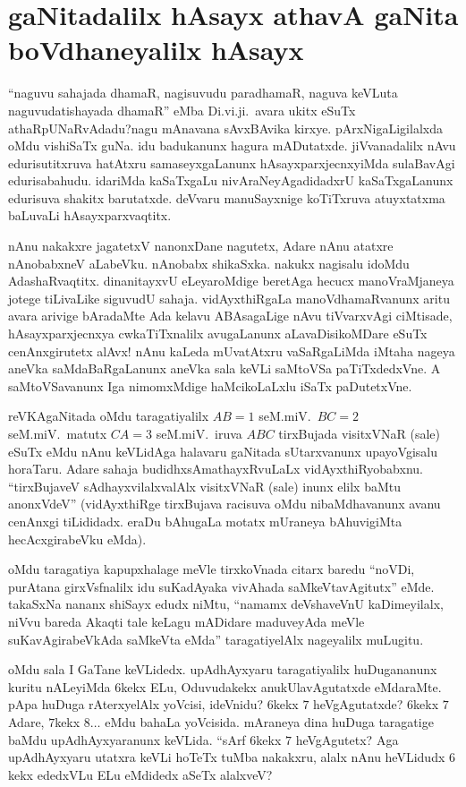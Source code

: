 \chapter{gaNitadalilx hAsayx athavA gaNita boVdhaneyalilx hAsayx}\label{chap14}

\qquad ``naguvu sahajada dhamaR, nagisuvudu paradhamaR, naguva keVLuta naguvudatishayada dhamaR'' eMba Di.vi.ji.\ avara ukitx eSuTx athaRpUNaRvAdadu?\break nagu mAnavana sAvxBAvika kirxye. pArxNigaLigilalxda oMdu vishiSaTx guNa. idu badukanunx\- hagura mADutatxde. jiVvanadalilx nAvu edurisutitxruva hatAtxru samaseyxgaLanunx hAsayxparxjecnxyiMda sulaBavAgi edurisabahudu. idariMda kaSaTxgaLu nivAraNeyAga\break didadxrU kaSaTxgaLanunx edurisuva shakitx barutatxde. deVvaru manuSayxnige koTiTxruva atuyxtatxma baLuvaLi hAsayxparxvaqtitx.

nAnu nakakxre jagatetxV nanonxDane nagutetx, Adare nAnu atatxre nAnobabxneV aLabeVku. nAnobabx shikaSxka. nakukx nagisalu idoMdu AdashaRvaqtitx. dinanitayxvU eLeyaroMdige beretAga hecucx manoVraMjaneya jotege tiLivaLike siguvudU sahaja. vidAyxthiRgaLa manoVdhamaRvanunx aritu avara arivige bAradaMte Ada kelavu ABAsagaLige nAvu tiVvarxvAgi ciMtisade, hAsayxparxjecnxya cwkaTiTxnalilx avugaLanunx aLavaDisikoMDare eSuTx cenAnxgirutetx alAvx! nAnu kaLeda mUvatAtxru vaSaRgaLiMda iMtaha nageya aneVka saMdaBaRgaLanunx aneVka sala keVLi saMtoVSa paTiTxdedxVne. A saMtoVSavanunx Iga nimomxMdige haMcikoLaLxlu iSaTx paDutetxVne.

\eject

reVKAgaNitada oMdu taragatiyalilx $AB=1$ seM.miV.\ $BC=2$ seM.miV.\ matutx $CA=3$ seM.miV.\ iruva $ABC$ tirxBujada visitxVNaR (sale) eSuTx eMdu nAnu keVLidAga halavaru gaNitada sUtarxvanunx upayoVgisalu horaTaru. Adare sahaja budidhxsAmathayxRvuLaLx vidAyxthiRyobabxnu. ``tirxBujaveV sAdhayxvilalxvalAlx visitxVNaR (sale) inunx elilx baMtu anonxVdeV'' (vidAyxthiRge tirxBujava racisuva oMdu nibaMdhavanunx avanu cenAnxgi tiLididadx. eraDu bAhugaLa motatx mUraneya bAhuvigiMta hecAcxgirabeVku eMda).

oMdu taragatiya kapupxhalage meVle tirxkoVnada citarx baredu ``noVDi, purAtana girxVsfnalilx idu suKadAyaka vivAhada saMkeVtavAgitutx'' eMde. takaSxNa nananx shiSayx edudx niMtu, ``namamx deVshaveVnU kaDimeyilalx, niVvu bareda Akaqti tale keLagu mADidare maduveyAda meVle suKavAgirabeVkAda saMkeVta eMda'' taragatiyelAlx nageyalilx muLugitu.

oMdu sala I GaTane keVLidedx. upAdhAyxyaru taragatiyalilx huDugananunx kuritu nALeyiMda $6$kekx ELu, Oduvudakekx anukUlavAgutatxde eMdaraMte. pApa huDuga rAterxyelAlx yoVcisi, ideVnidu? $6$kekx $7$ heVgAgutatxde? $6$kekx $7$ Adare, $7$kekx $8\ldots$ eMdu bahaLa yoVcisida. mAraneya dina huDuga taragatige baMdu upAdhAyxyaranunx keVLida. ``sArf $6$kekx $7$ heVgAgutetx? Aga upAdhAyxyaru utatxra keVLi hoTeTx tuMba nakakxru, alalx nAnu heVLidudx $6$kekx ededxVLu  ELu eMdidedx aSeTx alalxveV?

